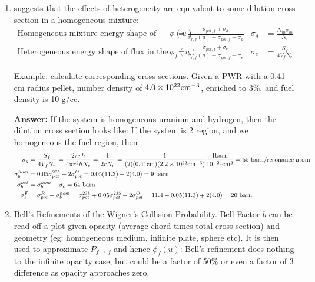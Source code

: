 \documentclass{school-22.211-notes}
\begin{document}
\begin{enumerate}
\item {} suggests that the effects of heterogeneity are equivalent to some dilution cross section in a homogeneous mixture:
\begin{align}
\mbox{Homogeneous mixture energy shape of flux } \phi(u) &= \frac{\sigma_{pot, f} + \sigma_d}{\sigma_{r,f} (u) + \sigma_{pot, f} + \sigma_d}   & \sigma_d &= \frac{N_m \sigma_m}{N_r}  \\
\mbox{Heterogeneous energy shape of flux in the fuel } \phi_f(u) &= \frac{\sigma_{pot, f} + \sigma_e}{\sigma_{r,f} (u) + \sigma_{pot, f} + \sigma_e}   & \sigma_e &= \frac{S_f}{4 V_f N_r} 
\end{align}

\uline{Example: calculate corresponding cross sections.} Given a PWR with a 0.41 cm radius pellet,  number density of $4.0 \times 10^{22} \mathrm{cm}^{-3}$, enriched to 3\%, and fuel density is 10 g/cc. 

\textbf{Answer:} 
If the system is homogeneous uranium and hydrogen, then the dilution cross section looks like:
If the system is 2 region, and we homogeneous the fuel region, then
\begin{align}
\sigma_e &= \frac{S_f}{4 V_f N_r} = \frac{2 \pi r h}{4 \pi r^2 h N_r} = \frac{1}{2 r N_r} = \frac{1}{(2)(0.41 \mathrm{cm})(2.2 \times 10^{22} \mathrm{cm}^{-3})} \frac{1 \mathrm{barn}}{10^{-24} \mathrm{cm}^2} = 55 \mbox{ } \mathrm{barn}/\mbox{resonance atom} \\
\sigma_b^{hom} &=  0.05 \sigma_{pot}^{235} + 2 \sigma_{pot}^O = 0.05 (11.3) + 2 (4.0) = 9 \mbox{ } \mathrm{barn} \\
\sigma_b^{het} &= \sigma_b^{hom} + \sigma_e = 64 \mbox{ } \mathrm{barn} \\ 
\sigma_s^F &= \sigma_{pot}^R + \sigma_b^{hom} = \sigma_{pot}^{238} + 0.05 \sigma_{pot}^{235} + 2 \sigma_{pot}^O = 11.4 + 0.05 (11.3) + 2 (4.0) = 20 \mbox{ } \mathrm{barn} 
\end{align} 


\item Bell's Refinements of the Wigner's Collision Probability. Bell Factor $b$ can be read off a plot given opacity (average chord times total cross section) and geometry (eg: homogeneous medium, infinite plate, sphere etc). It is then used to approximate $P_{f\to f}$ and hence $\phi_f(u)$:
Bell's refinement does nothing to the infinite opacity case, but could be a factor of 50\% or even a factor of 3 difference as opacity approaches zero. 


\end{enumerate}
\end{document}

